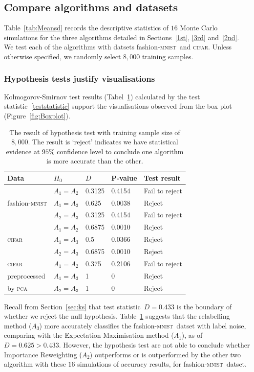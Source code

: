\documentclass[12pt]{article} %
\newcommand{\mnist}{fashion-\textsc{mnist}}
\begin{document}
\subsection{Compare algorithms and datasets}

Table~\ref{tab:Meansd} records the descriptive statistics of $16$ Monte Carlo simulations for the three algorithms detailed in Sections~\ref{1st}, \ref{3rd} and~\ref{2nd}.  We test each of the algorithms with datsets \mnist\ and \textsc{cifar}. Unless otherwise specified, we randomly select $8,000$ training samples.
\subsubsection{Hypothesis tests justify visualisations}
Kolmogorov-Smirnov test results (Tabel~\ref{tab:HypothesisTest}) calculated by the test statistic~\eqref{teststatistic} support the visualisations observed from the box plot (Figure~\ref{fig:Boxplot}).
\begin{table}%
\centering
 	\caption{The result of hypothesis test with training sample size of $8,000$. The result is `reject' indicates we have  statistical evidence at $95\%$ confidence level to conclude one algorithm is more accurate than the other.}
	\begin{tabular}{lllll}
\toprule
Data & $H_0$ & $D$ & P-value & Test result\\
\midrule
 & $A_1= A_2$  &0.3125 & 0.4154 & Fail to reject\\

\mnist & $A_1= A_3$ & 0.625 & 0.0038 & Reject\\

  & $A_2= A_3$ & 0.3125 & 0.4154 & Fail to reject\\
\midrule
   & $A_1= A_2$ & 0.6875 & 0.0010 & Reject\\

 \textsc{cifar}  & $A_1= A_3$ & 0.5 & 0.0366 & Reject\\

  &  $A_2=A_3$  & 0.6875 & 0.0010 & Reject\\
 \midrule
  \textsc{cifar} & $A_1= A_2$ & 0.375 & 0.2106 & Fail to reject\\

  preprocessed & $A_1= A_3$ & 1 & 0 & Reject\\

  by \textsc{pca} &  $A_2=A_3$  & 1 & 0 & Reject\\
\bottomrule
\end{tabular}

	\label{tab:HypothesisTest}
\end{table}
Recall from Section~\ref{sec:ks} that test statistic~$D=0.433$ is the boundary of whether we reject the null hypothesis. Table~\ref{tab:HypothesisTest} suggests that the relabelling method ($A_3$) more accurately classifies the \mnist\ datset with label noise, comparing with the Expectation Maximisation method ($A_1$), as of $D=0.625>0.433$.
However, the hypothesis test are not able to conclude whether Importance Reweighting ($A_2$) outperforms or is outperformed by the other two algorithm with these $16$ simulations of accuracy results, for \mnist\ datset.
\end{document}
